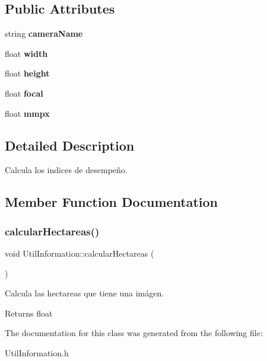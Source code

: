 \subsection*{Public Attributes}
\begin{DoxyCompactItemize}
\item 
\mbox{\label{classUtilInformation_a10ea8fadab95246ea379b53487781d39}} 
string {\bfseries camera\+Name}
\item 
\mbox{\label{classUtilInformation_aae2e357f15c578cf8321a39bda9daf72}} 
float {\bfseries width}
\item 
\mbox{\label{classUtilInformation_af4760e824ab47a230e2c13ac8b327712}} 
float {\bfseries height}
\item 
\mbox{\label{classUtilInformation_a55f7ab2ca0a2bb4d3ab6af4cd3b9d766}} 
float {\bfseries focal}
\item 
\mbox{\label{classUtilInformation_afdb6d6c41aa2150da6bd8ce842a50d03}} 
float {\bfseries mmpx}
\end{DoxyCompactItemize}


\subsection{Detailed Description}
Calcula los indices de desempeño. 

\subsection{Member Function Documentation}
\mbox{\label{classUtilInformation_a47f1a60e6815a3b1642a3324c476fb32}} 
\subsubsection{\texorpdfstring{calcular\+Hectareas()}{calcularHectareas()}}
{\footnotesize\ttfamily void Util\+Information\+::calcular\+Hectareas (\begin{DoxyParamCaption}{ }\end{DoxyParamCaption})\hspace{0.3cm}{\ttfamily [inline]}}



Calcula las hectareas que tiene una imágen. 

\begin{DoxyReturn}{Returns}
float 
\end{DoxyReturn}


The documentation for this class was generated from the following file\+:\begin{DoxyCompactItemize}
\item 
Util\+Information.\+h\end{DoxyCompactItemize}
